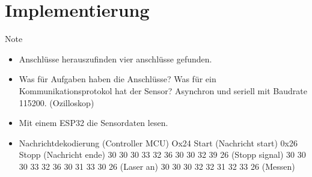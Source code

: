 \chapter{Implementierung}


Note
\begin{itemize}
	\item Anschlüsse herauszufinden vier anschlüsse gefunden.
	\item Was für Aufgaben haben die Anschlüsse?
	      \subitem Was für ein Kommunikationsprotokol hat der Sensor?
	      \subitem Asynchron und seriell mit Baudrate 115200. (Ozilloskop)
	\item Mit einem ESP32 die Sensordaten lesen.
	\item Nachrichtdekodierung (Controller MCU)
	      \subitem Ox24 Start (Nachricht start)
	      \subitem 0x26 Stopp (Nachricht ende)
	       30 30 30 33 32 36 30 30 32 39 26 (Stopp signal)
	       30 30 30 33 32 36 30 31 33 30 26 (Laser an)
	       30 30 30 32 32 31 32 33 26 (Messen)
\end{itemize}

